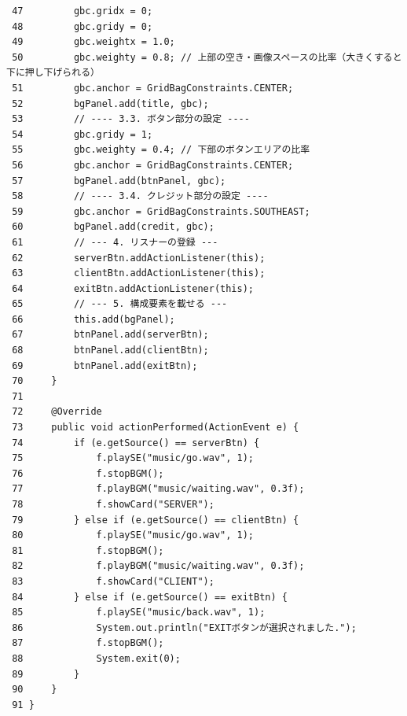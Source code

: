 \documentclass[11pt,a4j]{jarticle}
\begin{document}
\begin{small}
\begin{verbatim}
 47         gbc.gridx = 0;
 48         gbc.gridy = 0;
 49         gbc.weightx = 1.0;
 50         gbc.weighty = 0.8; // 上部の空き・画像スペースの比率（大きくすると下に押し下げられる）
 51         gbc.anchor = GridBagConstraints.CENTER;
 52         bgPanel.add(title, gbc);
 53         // ---- 3.3. ボタン部分の設定 ----
 54         gbc.gridy = 1;
 55         gbc.weighty = 0.4; // 下部のボタンエリアの比率
 56         gbc.anchor = GridBagConstraints.CENTER;
 57         bgPanel.add(btnPanel, gbc);
 58         // ---- 3.4. クレジット部分の設定 ----
 59         gbc.anchor = GridBagConstraints.SOUTHEAST;
 60         bgPanel.add(credit, gbc);
 61         // --- 4. リスナーの登録 ---
 62         serverBtn.addActionListener(this);
 63         clientBtn.addActionListener(this);
 64         exitBtn.addActionListener(this);
 65         // --- 5. 構成要素を載せる ---
 66         this.add(bgPanel);
 67         btnPanel.add(serverBtn);
 68         btnPanel.add(clientBtn);
 69         btnPanel.add(exitBtn);
 70     }
 71 
 72     @Override
 73     public void actionPerformed(ActionEvent e) {
 74         if (e.getSource() == serverBtn) {
 75             f.playSE("music/go.wav", 1);
 76             f.stopBGM();
 77             f.playBGM("music/waiting.wav", 0.3f);
 78             f.showCard("SERVER");
 79         } else if (e.getSource() == clientBtn) {
 80             f.playSE("music/go.wav", 1);
 81             f.stopBGM();
 82             f.playBGM("music/waiting.wav", 0.3f);
 83             f.showCard("CLIENT");
 84         } else if (e.getSource() == exitBtn) {
 85             f.playSE("music/back.wav", 1);
 86             System.out.println("EXITボタンが選択されました.");
 87             f.stopBGM();
 88             System.exit(0);
 89         }
 90     }
 91 }
\end{verbatim}
\end{small}
\end{document}
